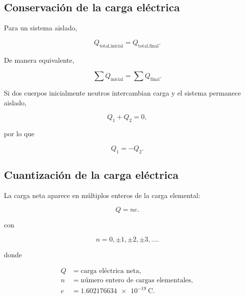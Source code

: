 
\subsection{Conservación de la carga eléctrica}

Para un sistema aislado,

\begin{equation}
    \boxed{
    Q_{\text{total,inicial}}
    =
    Q_{\text{total,final}}
    }.
\end{equation}

De manera equivalente,

\begin{equation}
    \boxed{
    \sum Q_{\text{inicial}}
    =
    \sum Q_{\text{final}}
    }.
\end{equation}

Si dos cuerpos inicialmente neutros intercambian carga y el sistema permanece
aislado,

\begin{equation}
    Q_1+Q_2=0,
\end{equation}

por lo que

\begin{equation}
    \boxed{
    Q_1=-Q_2
    }.
\end{equation}



\subsection{Cuantización de la carga eléctrica}

La carga neta aparece en múltiplos enteros de la carga elemental:

\begin{equation}
    \boxed{
    Q=ne
    }.
\end{equation}

con

\begin{equation}
    \boxed{
    n=0,\pm1,\pm2,\pm3,\ldots
    }.
\end{equation}

donde

\begin{align*}
    Q &= \text{carga eléctrica neta},\\
    n &= \text{número entero de cargas elementales},\\
    e &= \SI{1.602176634e-19}{\coulomb}.
\end{align*}


